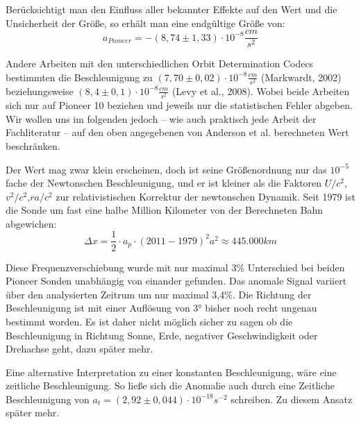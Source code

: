 Berücksichtigt man den Einfluss aller bekannter Effekte auf den Wert und die Unsicherheit der Größe,\cite{Turyshev2004} so erhält man eine endgültige Größe von:  
\begin{equation}
  a_{Pioneer} = -(8,74\pm1,33)\cdot10^{-8}\frac{cm}{s^2}
\end{equation}

Andere Arbeiten mit den  unterschiedlichen Orbit Determination Codecs bestimmten die Beschleunigung zu $(7,70
\pm0,02)\cdot10^{-8}\frac{cm}{s^2}$ (Markwardt, 2002)\cite{Markwardt2002} beziehungsweise
$(8,4\pm0,1)\cdot10^{-8}\frac{cm}{s^2}$ (Levy et al., 2008)\cite{Levy2008}.
Wobei beide Arbeiten sich nur auf Pioneer 10 beziehen und jeweils nur die statistischen Fehler abgeben.
Wir wollen uns im folgenden jedoch – wie auch praktisch jede Arbeit der Fachliteratur – auf den oben angegebenen von
Anderson et al. berechneten Wert beschränken.

Der Wert mag zwar klein erscheinen, doch ist seine Größenordnung nur das $10^{-5}$ fache der Newtonschen Beschleunigung,
und er ist kleiner als die Faktoren $U/c^2$,$v^2/c^2$,$r a/c^2$ zur relativistischen Korrektur der newtonschen Dynamik.
Seit 1979 ist die Sonde um fast eine halbe Million Kilometer von der Berechneten Bahn abgewichen:
\begin{equation}
  \Delta x= \frac12 \cdot a_p \cdot (2011-1979)^2 a^2\approx 445.000 km
\end{equation}

Diese Frequenzverschiebung wurde mit nur maximal 3\% Unterschied bei beiden Pioneer Sonden unabhängig von einander
gefunden. Das anomale Signal variiert über den analysierten Zeitrum um nur maximal 3,4\%.\cite{Turyshev2004} Die Richtung der
Beschleunigung ist mit einer Auflösung von 3° bisher noch recht ungenau bestimmt worden. Es ist daher nicht möglich
sicher zu sagen ob die Beschleunigung
in Richtung Sonne, Erde, negativer Geschwindigkeit oder Drehachse geht, dazu später mehr.

Eine alternative Interpretation zu einer konstanten Beschleunigung, wäre eine zeitliche Beschleunigung.
So ließe sich die Anomalie auch durch eine Zeitliche Beschleunigung von $a_t = (2,92 \pm 0,044) \cdot 10^{-18} s^{-2}$ schreiben. Zu diesem Ansatz später mehr.
